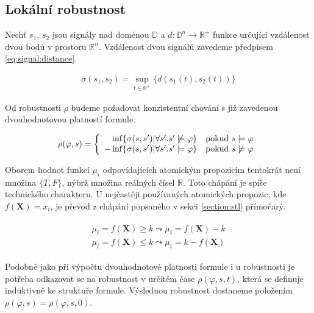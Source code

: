 \subsection{Lokální robustnost}

Nechť $s_1$, $s_2$ jsou signály nad doménou $\mathbb{D}$ a $d: \mathbb{D}^n \rightarrow \mathbb{R}^{+}$
funkce určující vzdálenost dvou bodů v prostoru $\mathbb{R}^n$. 
Vzdálenost dvou signálů zavedeme předpisem \ref{eq:signal:distance}.

\begin{align}\label{eq:signal:distance}
\sigma(s_1, s_2) = {\displaystyle \sup_{t \in \mathbb{R}^{+}}} \{d(s_1(t), s_2(t))\}
\end{align}

Od robustnosti $\rho$ budeme požadovat konzistentní chování s již zavedenou dvouhodnotovou platností
formule. 

\begin{align}
\rho(\varphi, s) = \left\{\begin{array}{r@{\quad}c}
\inf\{\sigma(s, s') | \forall s'. s' \not\models \varphi \}	& \textrm{pokud } s \models \varphi	\\
- \inf\{\sigma(s, s') | \forall s'. s' \models \varphi \}	& \textrm{pokud } s \not\models \varphi
\end{array} \right.
\end{align}

Oborem hodnot funkcí $\mu_i$ odpovídajících atomickým propozicím tentokrát není množina $\{T, F\}$,
nýbrž množina reálných čísel $\mathbb{R}$. Toto chápání je spíše technického charakteru. U nejčastěji používaných
atomických propozic, kde $f(\mathbf{X}) = x_i$, je převod z chápání popsaného v sekci \ref{section:stl} přímočarý.

\begin{align}\label{eq:stl:semantics}
\begin{array}{ll}
\mu_i = f(\mathbf{X}) \geq k		\leadsto \mu_i = f(\mathbf{X}) - k							\\
\mu_i = f(\mathbf{X}) \leq k		\leadsto \mu_i = k - f(\mathbf{X})
\end{array}
\end{align}

Podobně jako při výpočtu dvouhodnotové platnosti formule i u robustnosti je potřeba odkazovat se
na robustnost v určitém čase $\rho(\varphi, s, t)$, která se definuje induktivně ke struktuře
formule. Výslednou robustnost dostaneme položením $\rho(\varphi, s) = \rho(\varphi, s, 0)$.

